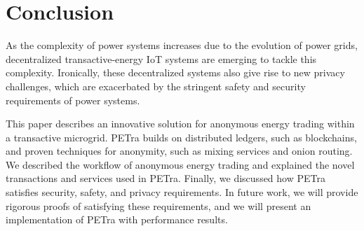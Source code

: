 \section{Conclusion}
\label{sec:concl}

As the complexity of power systems increases due to the evolution of
power grids, decentralized transactive-energy IoT systems are emerging
to tackle this complexity. Ironically, these decentralized systems
also give rise to new privacy challenges,
which are exacerbated by the stringent safety and
security requirements of power systems.

This paper describes  an
innovative solution for anonymous energy trading within a transactive
microgrid.  PETra builds on distributed ledgers, such as
blockchains, and proven techniques for anonymity, such as mixing
services and onion routing.  We described the workflow of
anonymous energy trading and explained the novel transactions and
services used in PETra.  Finally, we discussed how PETra
 satisfies security, safety, and privacy requirements.  In
future work, we will provide rigorous proofs of satisfying these
requirements, and we will present an implementation of PETra with
performance results.
